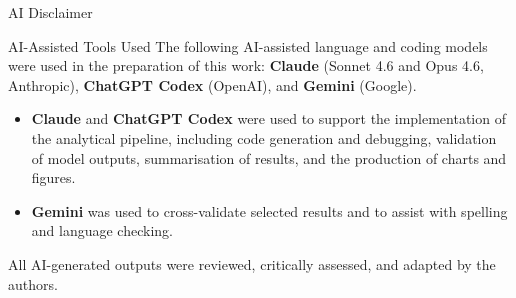 \documentclass[10pt]{beamer}\usepackage[]{graphicx}\usepackage[table]{xcolor}
\begin{document}

\begin{frame}{AI Disclaimer}

  \begin{block}{AI-Assisted Tools Used}
    The following AI-assisted language and coding models were used in the
    preparation of this work:
    \textbf{Claude} (Sonnet 4.6 and Opus 4.6, Anthropic),
    \textbf{ChatGPT Codex} (OpenAI), and
    \textbf{Gemini} (Google).
  \end{block}

  \vspace{0.5em}

  \begin{itemize}
    \setlength\itemsep{0.7em}
    \item \textbf{Claude} and \textbf{ChatGPT Codex} were used to support the
          implementation of the analytical pipeline, including code generation and
          debugging, validation of model outputs, summarisation of results, and the
          production of charts and figures.
    \item \textbf{Gemini} was used to cross-validate selected results and to assist
          with spelling and language checking.
  \end{itemize}

  \vspace{0.5em}

  \begin{alertblock}{}
    \centering
    All AI-generated outputs were reviewed, critically assessed, and adapted by
    the authors.
  \end{alertblock}

\end{frame}

\end{document}
